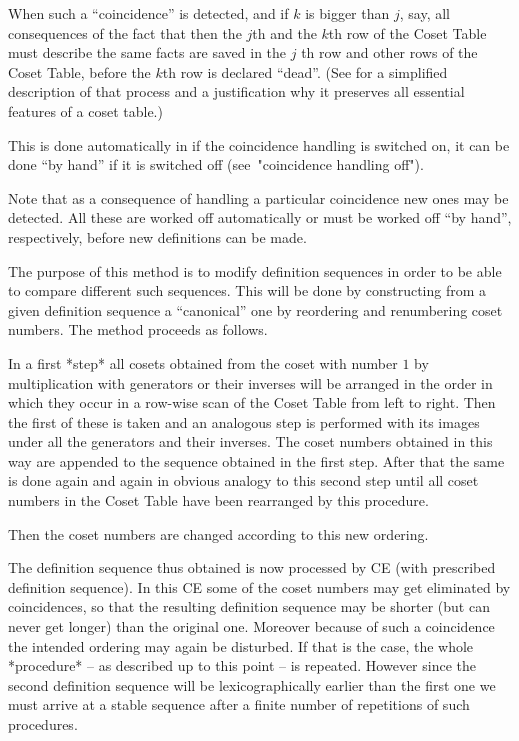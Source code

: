 When such a ``coincidence'' is detected, and if $k$ is bigger than $j$,
say, all consequences of the fact that then the $j$th and the $k$th
row of the Coset Table must describe the same facts are saved in the
$j$ th row and other rows of the Coset Table, before the $k$th row is
declared ``dead''. (See \cite{Neu82} for a simplified description of
that process and a justification why it preserves all essential
features of a coset table.)

This is done automatically in {\ITC} if the coincidence handling is
switched on, it can be done ``by hand'' if it is switched off
(see~"coincidence handling off").

Note that as a consequence of handling a particular coincidence new
ones may be detected. All these are worked off automatically or must
be worked off ``by hand'', respectively, before new definitions can be
made.




The purpose of this method is to modify definition sequences in order
to be able to compare different such sequences. This will be done by
constructing from a given definition sequence a ``canonical'' one by
reordering and renumbering coset numbers. The method proceeds as
follows.

In a first *step* all cosets obtained from the coset with number $1$
by multiplication with generators or their inverses will be arranged
in the order in which they occur in a row-wise scan of the Coset Table
from left to right. Then the first of these is taken and an analogous
step is performed with its images under all the generators and their
inverses. The coset numbers obtained in this way are appended to the
sequence obtained in the first step. After that the same is done again
and again in obvious analogy to this second step until all coset
numbers in the Coset Table have been rearranged by this procedure.

Then the coset numbers are changed according to this new ordering.

The definition sequence thus obtained is now processed by CE (with
prescribed definition sequence). In this CE some of the coset numbers
may get eliminated by coincidences, so that the resulting definition
sequence may be shorter (but can never get longer) than the original
one. Moreover because of such a coincidence the intended ordering may
again be disturbed. If that is the case, the whole *procedure* -- as
described up to this point -- is repeated. However since the second
definition sequence will be lexicographically earlier than the first
one we must arrive at a stable sequence after a finite number of
repetitions of such procedures.

